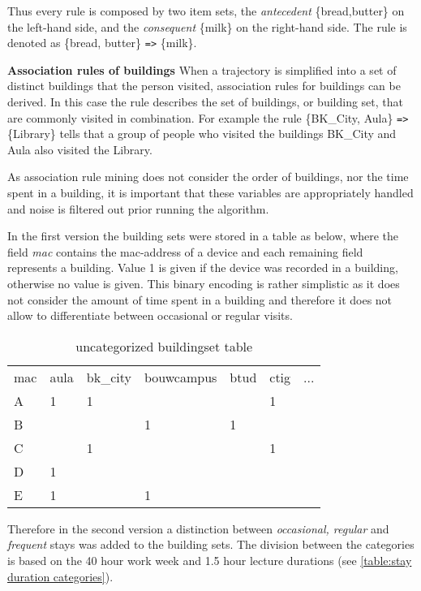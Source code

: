 Thus every rule is composed by two item sets, the \textit{antecedent}
\{bread,butter\} on the left-hand side, and the \textit{consequent} \{milk\} on
the right-hand side. The rule is denoted as \{bread, butter\} \verb|=>| \{milk\}.

\textbf{Association rules of buildings}
When a trajectory is simplified into a set of distinct buildings that the person
visited, association rules for buildings can be derived. In this case the rule
describes the set of buildings, or building set, that are commonly visited in
combination. For example the rule \{BK\_City, Aula\} \verb|=>| \{Library\}
tells that a group of people who visited the buildings BK\_City and Aula also
visited the Library.

As association rule mining does not consider the order of buildings, nor the
time spent in a building, it is important that these variables are appropriately
handled and noise is filtered out prior running the algorithm.

In the first version the building sets were stored in a table as below, where the
field \textit{mac} contains the mac-address of a device and each remaining field
represents a building. Value 1 is given if the device was recorded in a
building, otherwise no value is given. This binary encoding is rather simplistic
as it does not consider the amount of time spent in a building and therefore it
does not allow to differentiate between occasional or regular visits.

\begin{table}[H]
\centering
\captionsetup{justification=centering}
\caption{uncategorized buildingset table}
\label{uncategorized buildingset table}
\begin{tabular}{lllllll}
\cline{1-7}
mac & aula & bk\_city & bouwcampus & btud & ctig & ... \\ \cline{1-7}
A   & 1 & 1     &           &   & 1 &   \\
B   &   &       & 1         & 1 &   &   \\
C   &   & 1     &           &   & 1 &   \\
D   & 1 &       &           &   &   &   \\
E   & 1 &       & 1         &   &   &   \\ \cline{1-7}
\end{tabular}
\end{table}

Therefore in the second version a distinction between \textit{occasional,
regular} and \textit{frequent} stays was added to the building sets. The division
between the categories is based on the 40 hour work week and 1.5 hour lecture
durations (see \autoref{table:stay duration categories}). 

